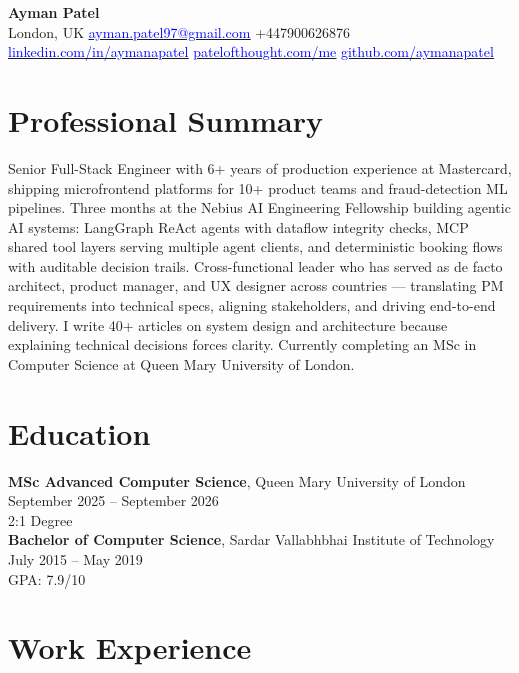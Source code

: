 \documentclass[a4paper,10pt]{article}
\let\oldhref\href
\renewcommand{\href}[2]{\oldhref{#1}{\uline{\textcolor{blue}{#2}}}}
\begin{document}
\begin{center}
  {\LARGE \textbf{Ayman Patel}}\\
  \vspace{2pt}
  London, UK \textbullet{}
  \href{mailto:ayman.patel97@gmail.com}{ayman.patel97@gmail.com} \textbullet{}
  +447900626876 \textbullet{}
  \href{https://linkedin.com/in/aymanapatel}{linkedin.com/in/aymanapatel} \textbullet{}
  \href{https://patelofthought.com/me}{patelofthought.com/me} \textbullet{}
  \href{https://github.com/aymanapatel}{github.com/aymanapatel}
\end{center}

\section{Professional Summary}
{\small
Senior Full-Stack Engineer with 6+ years of production experience at Mastercard, shipping microfrontend platforms for 10+ product teams and fraud-detection ML pipelines. Three months at the Nebius AI Engineering Fellowship building agentic AI systems: LangGraph ReAct agents with dataflow integrity checks, MCP shared tool layers serving multiple agent clients, and deterministic booking flows with auditable decision trails. Cross-functional leader who has served as de facto architect, product manager, and UX designer across countries --- translating PM requirements into technical specs, aligning stakeholders, and driving end-to-end delivery. I write 40+ articles on system design and architecture because explaining technical decisions forces clarity. Currently completing an MSc in Computer Science at Queen Mary University of London.
}

\section{Education}
\textbf{MSc Advanced Computer Science}, Queen Mary University of London \hfill {\small September 2025 -- September 2026}\\ {\small 2:1 Degree}\\
\textbf{Bachelor of Computer Science}, Sardar Vallabhbhai Institute of Technology \hfill {\small July 2015 -- May 2019}\\
{\small GPA: 7.9/10}

\section{Work Experience}
\end{document}
